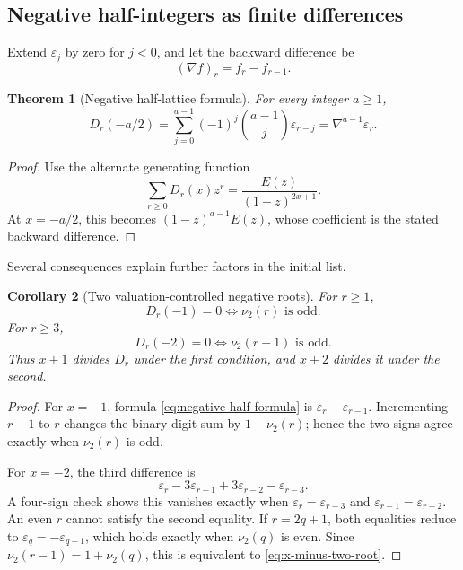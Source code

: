 \documentclass[11pt,oneside]{article}
\numberwithin{equation}{section}
\newtheorem{theorem}{Theorem}[section]
\newtheorem{corollary}[theorem]{Corollary}
\theoremstyle{definition}
\theoremstyle{remark}
\newcommand{\eps}{\varepsilon}
\newcommand{\nuTwo}{\nu_2}
\newcommand{\Diag}{D}
\begin{document}
\subsection{Negative half-integers as finite differences}

Extend \(\eps_j\) by zero for \(j<0\), and let the backward difference be
\begin{equation}
 (\nabla f)_r=f_r-f_{r-1}.
 \label{eq:backward-difference}
\end{equation}

\begin{theorem}[Negative half-lattice formula]
For every integer \(a\ge1\),
\begin{equation}
 \boxed{
 \Diag_r(-a/2)
 =\sum_{j=0}^{a-1}(-1)^j\binom{a-1}{j}\eps_{r-j}
 =\nabla^{a-1}\eps_r.}
 \label{eq:negative-half-formula}
\end{equation}
\end{theorem}

\begin{proof}
Use the alternate generating function
\[
 \sum_{r\ge0}\Diag_r(x)z^r
 =\frac{E(z)}{(1-z)^{2x+1}}.
\]
At \(x=-a/2\), this becomes \((1-z)^{a-1}E(z)\), whose coefficient is the
stated backward difference.
\end{proof}

Several consequences explain further factors in the initial list.

\begin{corollary}[Two valuation-controlled negative roots]
For \(r\ge1\),
\begin{equation}
 \Diag_r(-1)=0
 \iff \nuTwo(r)\text{ is odd}.
 \label{eq:x-minus-one-root}
\end{equation}
For \(r\ge3\),
\begin{equation}
 \Diag_r(-2)=0
 \iff \nuTwo(r-1)\text{ is odd}.
 \label{eq:x-minus-two-root}
\end{equation}
Thus \(x+1\) divides \(\Diag_r\) under the first condition, and \(x+2\)
divides it under the second.
\end{corollary}

\begin{proof}
For \(x=-1\), formula \eqref{eq:negative-half-formula} is
\(\eps_r-\eps_{r-1}\).  Incrementing \(r-1\) to \(r\) changes the binary
digit sum by \(1-\nuTwo(r)\); hence the two signs agree exactly when
\(\nuTwo(r)\) is odd.

For \(x=-2\), the third difference is
\[
 \eps_r-3\eps_{r-1}+3\eps_{r-2}-\eps_{r-3}.
\]
A four-sign check shows this vanishes exactly when
\(\eps_r=\eps_{r-3}\) and \(\eps_{r-1}=\eps_{r-2}\).  An even \(r\) cannot
satisfy the second equality.  If \(r=2q+1\), both equalities reduce to
\(\eps_q=-\eps_{q-1}\), which holds exactly when \(\nuTwo(q)\) is even.
Since \(\nuTwo(r-1)=1+\nuTwo(q)\), this is equivalent to
\eqref{eq:x-minus-two-root}.
\end{proof}
\end{document}
